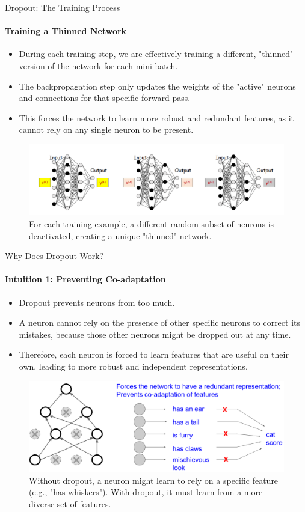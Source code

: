 \begin{frame}{Dropout: The Training Process}
    \framesubtitle{Training a Thinned Network}
    \small
    \begin{itemize}
        \item During each training step, we are effectively training a different, "thinned" version of the network for each mini-batch.
        \item The backpropagation step only updates the weights of the "active" neurons and connections for that specific forward pass.
        \item This forces the network to learn more robust and redundant features, as it cannot rely on any single neuron to be present.
    \end{itemize}
    \begin{figure}
        \centering
        \includegraphics[width=\linewidth]{images/dropout_training_process.png}
        \caption{For each training example, a different random subset of neurons is deactivated, creating a unique "thinned" network.}
    \end{figure}
\end{frame}

\begin{frame}{Why Does Dropout Work?}
    \framesubtitle{Intuition 1: Preventing Co-adaptation}
    \small 
    \begin{itemize}
        \item Dropout prevents neurons from  too much.
        \item A neuron cannot rely on the presence of other specific neurons to correct its mistakes, because those other neurons might be dropped out at any time.
        \item Therefore, each neuron is forced to learn features that are useful on their own, leading to more robust and independent representations.
    \end{itemize}
    \begin{figure}
        \centering
        \includegraphics[width=0.8\linewidth]{images/dropout_coadaptation.png}
        \caption{Without dropout, a neuron might learn to rely on a specific feature (e.g., "has whiskers"). With dropout, it must learn from a more diverse set of features.}
    \end{figure}
\end{frame}

